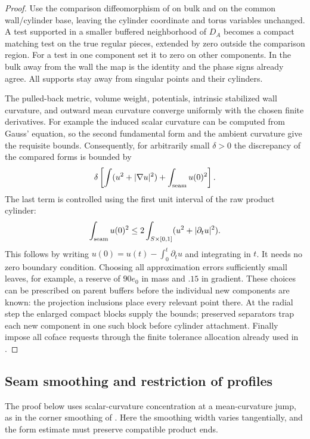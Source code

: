 \documentclass[11pt]{article}
\numberwithin{equation}{section}
\theoremstyle{definition}
\theoremstyle{remark}
\begin{document}
\begin{proof}
Use the comparison diffeomorphism of  on bulk
and on the common wall/cylinder base, leaving the cylinder coordinate
and torus variables unchanged.  A test supported in a smaller buffered
neighborhood of $D_A$ becomes a compact matching test on the true
regular pieces, extended by zero outside the comparison region.  For
a test in one component set it to zero on other components.  In the
bulk away from the wall the map is the identity and the phase signs
already agree.  All supports stay away from singular points and their
cylinders.

The pulled-back metric, volume weight, potentials, intrinsic stabilized
wall curvature, and outward mean curvature converge uniformly with the
chosen finite derivatives.  For example the induced scalar curvature
can be computed from Gauss' equation, so the second fundamental form
and the ambient curvature give the requisite bounds.  Consequently,
for arbitrarily small $\delta>0$ the discrepancy of the compared forms
is bounded by
\[
 \delta\left[\int(u^2+|\nabla u|^2)+\int_{\rm seam}u(0)^2\right].
\]
The last term is controlled using the first unit interval of the raw
product cylinder:
\begin{equation}\label{regular:trace}
 \int_{\rm seam}u(0)^2
 \le 2\int_{S\times[0,1]}(u^2+|\partial_tu|^2).
\end{equation}
This follows by writing $u(0)=u(t)-\int_0^t\partial_tu$ and integrating
in $t$.  It needs no zero boundary condition.  Choosing all approximation
errors sufficiently small leaves, for example, a reserve of $90e_0$
in mass and $.15$ in gradient.  These choices can be prescribed on
parent buffers before the individual new components are known: the
projection inclusions place every relevant point there.  At the radial
step the enlarged compact blocks supply the bounds; preserved
separators trap each new component in one such block before cylinder
attachment.  Finally impose all coface requests through the finite
tolerance allocation already used in .
\end{proof}

\subsection{Seam smoothing and restriction of profiles}

The proof below uses scalar-curvature concentration at a mean-curvature
jump, as in the corner smoothing of
\citet[Sections~2--3]{miao2002Corners}.  Here the smoothing width varies
tangentially, and the form estimate must preserve compatible product ends.
\end{document}
